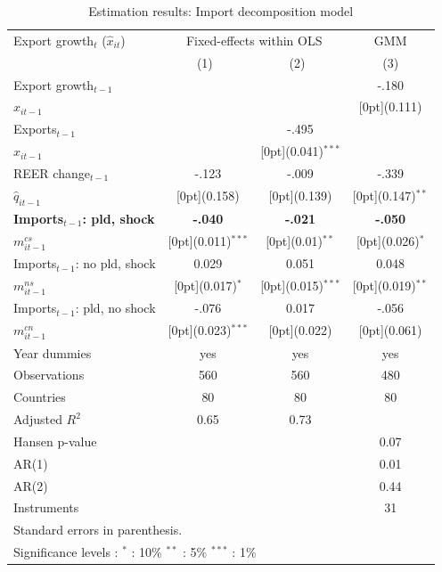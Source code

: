 \documentclass[10pt,letterpaper]{article}
\begin{document}
\begin{table}[!htb]\centering
 \caption{Estimation results: Import decomposition model
\label{tab:ImportDecompModel}}
\begin{tabular*}{0.8\textwidth}{@{\extracolsep{\fill}}lccc}		
Export growth$_t$ ($\hat{x}_{it}$)	& \multicolumn{2}{c}{Fixed-effects within OLS} &	\multicolumn{1}{c}{GMM} \\
\cline{2-4}			
	& \multicolumn{1}{c}{(1)\mbox{\ }} &	\multicolumn{1}{c}{(2)\mbox{\ }} &	\multicolumn{1}{c}{(3)} \\
\hline			
Export growth$_{t-1}$ &	&	 &	-.180\\
\quad $\hat{x}_{it-1}$ &	&	 &	\raisebox{.7ex}[0pt]{\scriptsize (0.111)}\\
Exports$_{t-1}$ &	&	-.495 &	 \\
\quad $x_{it-1}$ &	&	\raisebox{.7ex}[0pt]{\scriptsize (0.041)$^{***}$} & 	 \\
REER change$_{t-1}$ &	-.123 &	-.009 &	-.339 \\
\quad $\hat{q}_{it-1}$ &	\raisebox{.7ex}[0pt]{\scriptsize (0.158)} &	\raisebox{.7ex}[0pt]{\scriptsize (0.139)} &	\raisebox{.7ex}[0pt]{\scriptsize (0.147)$^{**}$} \\
\textbf{Imports$_{t-1}$: pld, shock} &	\textbf{-.040} &	\textbf{-.021} &	\textbf{-.050} \\
\quad $m^{cs}_{it-1}$ &	\raisebox{.7ex}[0pt]{\scriptsize (0.011)$^{***}$} &	\raisebox{.7ex}[0pt]{\scriptsize (0.01)$^{**}$} &	\raisebox{.7ex}[0pt]{\scriptsize (0.026)$^{*}$} \\
Imports$_{t-1}$: no pld, shock &	0.029 &	0.051 &	0.048 \\
\quad $m^{ns}_{it-1}$ &	\raisebox{.7ex}[0pt]{\scriptsize (0.017)$^{*}$} &	\raisebox{.7ex}[0pt]{\scriptsize (0.015)$^{***}$} &	\raisebox{.7ex}[0pt]{\scriptsize (0.019)$^{**}$} \\
Imports$_{t-1}$: pld, no shock &	-.076 &	0.017 &	-.056 \\
\quad $m^{cn}_{it-1}$ &	\raisebox{.7ex}[0pt]{\scriptsize (0.023)$^{***}$} &	\raisebox{.7ex}[0pt]{\scriptsize (0.022)} &	\raisebox{.7ex}[0pt]{\scriptsize (0.061)} \\
Year dummies &	yes &	yes &	yes \\
\hline
Observations &	560 &	560 &	480 	\\
Countries & 80 & 80 & 80 \\
Adjusted $R^2$ &	0.65  &	0.73 &	\\
Hansen p-value & & & 0.07 \\
AR(1) & & & 0.01 \\
AR(2) & & & 0.44\\
Instruments & & & 31 \\
\hline\hline					
\multicolumn{4}{l}{\footnotesize{Standard errors in parenthesis.}}\\
\multicolumn{4}{l}{\footnotesize{Significance levels
:\hspace{1em} $^{*}$ : 10\% \hspace{1em}
$^{**}$ : 5\% \hspace{1em} $^{***}$ : 1\% \normalsize}}
\end{tabular*}
\end{table}			
\end{document}
